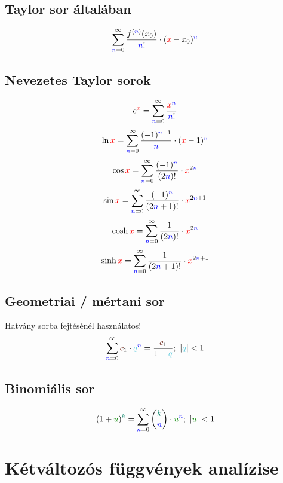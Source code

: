 \documentclass[a4paper,12pt]{article}
\begin{document}
\subsection{Taylor sor általában}

\begin{equation}
\sumi \frac{f^{(\n)}(x_0)}{\n!} \cdot (\x-x_0)^{\n}
\end{equation}

\subsection{Nevezetes Taylor sorok}
\begin{equation}
e^{\x} = \sumi \frac{{\x}^{\n}}{\n!}
\end{equation}
\begin{equation}
\ln \x = \sumi \frac{(-1)^{\n-1}}{\n} \cdot (\x-1)^{\n}
\end{equation}
\begin{equation}
\cos \x = \sumi \frac{(-1)^{\n}}{(2\n)!} \cdot \x^{2\n}
\end{equation}
\begin{equation}
\sin \x = \sumi \frac{(-1)^{\n}}{(2\n+1)!} \cdot \x^{2\n+1}
\end{equation}
\begin{equation}
\cosh \x = \sumi \frac{1}{(2\n)!} \cdot \x^{2\n}
\end{equation}
\begin{equation}
\sinh \x = \sumi \frac{1}{(2\n+1)!} \cdot \x^{2\n+1}
\end{equation}

\subsection{Geometriai / mértani sor}
Hatvány sorba fejtésénél használatos!
\begin{equation}
\sumi \c_1 \cdot \q^{\n} = \frac{\c_1}{1-\q};\ |\q| < 1
\end{equation}

\subsection{Binomiális sor}
\begin{equation}
  (1+\u)^{\k} = \sumi \binom{\k}{\n} \cdot {\u}^{\n};\ |\u| < 1
\end{equation}

\section{Kétváltozós függvények analízise}
\end{document}
